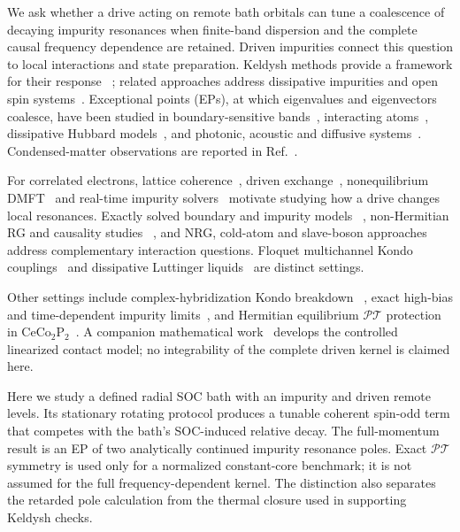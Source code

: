 \documentclass[%
  aps,physrev,onecolumn,10pt,amsmath,amssymb,superscriptaddress,longbibliography,floatfix
]{revtex4-2}
\newcommand{\PT}{\mathcal{PT}}
\begin{document}
We ask whether a drive acting on remote bath orbitals can tune a
coalescence of decaying impurity resonances when finite-band dispersion and
the complete causal frequency dependence are retained. Driven impurities
connect this question to local interactions and state preparation.
Keldysh methods provide a framework for their response
~\cite{kamenev2023field,popruzhenko2014keldysh,maghrebi2016nonequilibrium};
related approaches address dissipative impurities and open spin
systems~\cite{kulkscipo,Claeys2022RGdissipative}.
Exceptional points (EPs), at which eigenvalues and eigenvectors coalesce,
have been studied in boundary-sensitive bands~\cite{YaoWang2018},
interacting atoms~\cite{higherorder}, dissipative Hubbard
models~\cite{PhysRevLett.126.110404}, and photonic, acoustic and diffusive
systems~\cite{xia2021nonlinear,smirnova2020nonlinear,xue2022topological,
RevModPhys.96.015002,dai2024non,PhysRevLett.132.156901,khanikaev2024topological}.
Condensed-matter observations are reported in
Ref.~\cite{li2024discoverynonhermitianphasetransition}.

For correlated electrons, lattice coherence~\cite{wan2023evidence},
driven exchange~\cite{mentink2015ultrafast}, nonequilibrium
DMFT~\cite{aoki2014nonequilibrium} and real-time impurity
solvers~\cite{PhysRevX.7.031013} motivate studying how a drive changes local
resonances.  Exactly solved boundary and impurity models
~\cite{kattel2024kondo,kattel2024spin,kattel2024dissipation},
non-Hermitian RG and causality studies
~\cite{PhysRevB.111.125157,han2023complex,PhysRevB.111.045124},
and NRG, cold-atom and slave-boson approaches
~\cite{burke2025non,PhysRevLett.121.203001,SBkeld} address complementary
interaction questions.  Floquet multichannel Kondo
couplings~\cite{quito2023floquet} and dissipative Luttinger
liquids~\cite{PhysRevB.108.155120} are distinct settings.

Other settings include complex-hybridization Kondo breakdown
~\cite{yamamoto2026complex}, exact high-bias and time-dependent impurity
limits~\cite{oguri2013highbias,pasnoori2025tdkondo}, and Hermitian equilibrium
$\PT$ protection in CeCo$_2$P$_2$~\cite{hu2025ceco2p2}.
A companion mathematical work~\cite{KulkarniYB2026} develops the controlled
linearized contact model; no integrability of the complete driven kernel is
claimed here.

Here we study a defined radial SOC bath with an impurity and driven remote
levels.  Its stationary rotating protocol produces a tunable coherent
spin-odd term that competes with the bath's SOC-induced relative decay.
The full-momentum result is an EP of two analytically continued impurity
resonance poles.  Exact $\PT$ symmetry is used only for a normalized
constant-core benchmark; it is not assumed for the full frequency-dependent
kernel.  The distinction also separates the retarded pole calculation from
the thermal closure used in supporting Keldysh checks.
\end{document}
